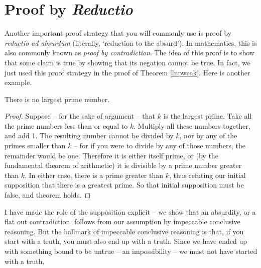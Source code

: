 \section{Proof by \emph{Reductio}}
Another important proof strategy that you will commonly use is proof by \emph{reductio ad absurdum} (literally, `reduction to the absurd'). In mathematics, this is also commonly known as \emph{proof by contradiction}. The idea of this proof is to show that some claim is true by showing that its negation cannot be true. In fact, we just used this proof strategy in the proof of Theorem \ref{lnpweak}. Here is another example. \begin{theorem} There is no largest prime number. \begin{proof}
Suppose – for the sake of argument – that $k$ is the largest prime. Take all the prime numbers less than or equal to $k$. Multiply all these numbers together, and add 1. The resulting number cannot be divided by $k$, nor by any of the primes smaller than $k$ – for if you were to divide by any of those numbers, the remainder would be one. Therefore it is either itself prime, or (by the fundamental theorem of arithmetic) it is divisible by a prime number greater than $k$. In either case, there is a prime greater than $k$, thus refuting our initial supposition that there is a greatest prime. So that initial supposition must be false, and theorem holds.
\end{proof}\end{theorem} I have made the role of the supposition explicit – we show that an absurdity, or a flat out contradiction, follows from our assumption by impeccable conclusive reasoning. But the hallmark of impeccable conclusive reasoning is that, if you start with a truth, you must also end up with a truth. Since we have ended up with something bound to be untrue – an impossibility – we must not have started with a truth. 

